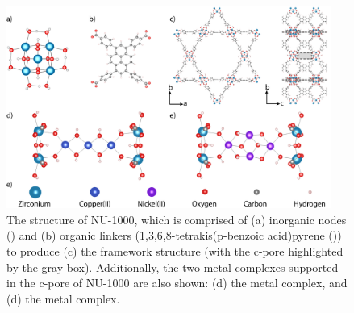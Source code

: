 \documentclass[journal=jctcce,manuscript=article]{achemso}
\begin{document}
\begin{figure}[t]
    \centering
    \includegraphics[width=0.95\textwidth]{zi-images/00-General-Graphics/2020-07-31-Combined-MOF-Figure-final.png}
    \caption{The structure of NU-1000, which is comprised of (a)  inorganic nodes () and (b) organic linkers (1,3,6,8-tetrakis(p-benzoic acid)pyrene ()) to produce (c) the framework structure (with the c-pore highlighted by the gray box). Additionally, the two metal complexes supported in the c-pore of NU-1000 are also shown: (d) the  metal complex, and (d) the  metal complex.}
    \label{fig:MOFstructure}
\end{figure}









\end{document}
